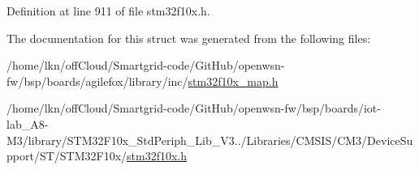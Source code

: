 Definition at line 911 of file stm32f10x.\+h.



The documentation for this struct was generated from the following files\+:\begin{DoxyCompactItemize}
\item 
/home/lkn/off\+Cloud/\+Smartgrid-\/code/\+Git\+Hub/openwsn-\/fw/bsp/boards/agilefox/library/inc/\hyperlink{agilefox_2library_2inc_2stm32f10x__map_8h}{stm32f10x\+\_\+map.\+h}\item 
/home/lkn/off\+Cloud/\+Smartgrid-\/code/\+Git\+Hub/openwsn-\/fw/bsp/boards/iot-\/lab\+\_\+\+A8-\/\+M3/library/\+S\+T\+M32\+F10x\+\_\+\+Std\+Periph\+\_\+\+Lib\+\_\+\+V3../\+Libraries/\+C\+M\+S\+I\+S/\+C\+M3/\+Device\+Support/\+S\+T/\+S\+T\+M32\+F10x/\hyperlink{iot-lab___a8-_m3_2library_2_s_t_m32_f10x___std_periph___lib___v3_85_80_2_libraries_2_c_m_s_i_s_26497265545392eb5694b064ae15018db}{stm32f10x.\+h}\end{DoxyCompactItemize}
